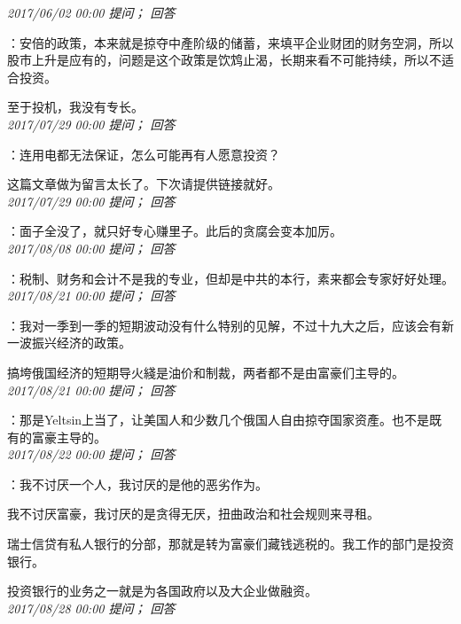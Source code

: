 \documentclass[twocolumn]{ctexart}
\begin{document}
\textit{\hfill\noindent\small 2017/06/02 00:00 提问； 回答}

：安倍的政策，本来就是掠夺中產阶级的储蓄，来填平企业财团的财务空洞，所以股市上升是应有的，问题是这个政策是饮鸩止渴，长期来看不可能持续，所以不适合投资。

至于投机，我没有专长。\\

\textit{\hfill\noindent\small 2017/07/29 00:00 提问； 回答}

：连用电都无法保证，怎么可能再有人愿意投资？

这篇文章做为留言太长了。下次请提供链接就好。\\

\textit{\hfill\noindent\small 2017/07/29 00:00 提问； 回答}

：面子全没了，就只好专心赚里子。此后的贪腐会变本加厉。\\

\textit{\hfill\noindent\small 2017/08/08 00:00 提问； 回答}

：税制、财务和会计不是我的专业，但却是中共的本行，素来都会专家好好处理。\\

\textit{\hfill\noindent\small 2017/08/21 00:00 提问； 回答}

：我对一季到一季的短期波动没有什么特别的见解，不过十九大之后，应该会有新一波振兴经济的政策。

搞垮俄国经济的短期导火綫是油价和制裁，两者都不是由富豪们主导的。
\\

\textit{\hfill\noindent\small 2017/08/21 00:00 提问； 回答}

：那是Yeltsin上当了，让美国人和少数几个俄国人自由掠夺国家资產。也不是既有的富豪主导的。\\

\textit{\hfill\noindent\small 2017/08/22 00:00 提问； 回答}

：我不讨厌一个人，我讨厌的是他的恶劣作为。

我不讨厌富豪，我讨厌的是贪得无厌，扭曲政治和社会规则来寻租。

瑞士信贷有私人银行的分部，那就是转为富豪们藏钱逃税的。我工作的部门是投资银行。

投资银行的业务之一就是为各国政府以及大企业做融资。\\

\textit{\hfill\noindent\small 2017/08/28 00:00 提问； 回答}
\end{document}
